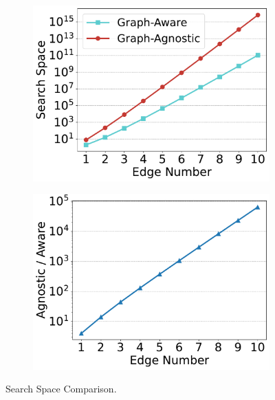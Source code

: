 \begin{figure}[t]
    \centering
    \begin{subfigure}[b]{.45\linewidth}
        \centering
        \includegraphics[width=\linewidth]{./figures/exp/compare_search_space.pdf}
    \end{subfigure}
    \begin{subfigure}[b]{0.45\linewidth}
        \centering
        \includegraphics[width=\linewidth]{./figures/exp/compare_search_space_ratio.pdf}
    \end{subfigure}
    \caption{Search Space Comparison.}
    \label{fig:exp-search-space}
\end{figure}
